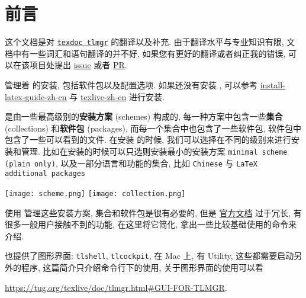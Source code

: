 \section*{前\quad 言}

这个文档是对 \href{https://www.tug.org/texlive/devsrc/Master/texmf-dist/doc/latex/tlmgrbasics/tlmgr.pdf}{\texttt{texdoc tlmgr}} 的翻译以及补充. 由于翻译水平与专业知识有限, 文档中有一些词汇和语句翻译的并不好, 如果您有更好的翻译或者纠正我的错误, 可以在该项目处提出 \href{https://github.com/syvshc/tlmgr-intro-zh-cn/issues}{issue} 或者 \href{https://github.com/syvshc/tlmgr-intro-zh-cn/pulls}{PR}. 

\tlmgr 管理着 \tl 的安装, 包括软件包以及配置选项. 如果还没有安装 \tl, 可以参考 \href{https://www.tug.org/texlive/devsrc/Master/texmf-dist/doc/latex/install-latex-guide-zh-cn/install-latex-guide-zh-cn.pdf}{install-latex-guide-zh-cn} 与 \href{https://www.tug.org/texlive/doc/texlive-zh-cn/texlive-zh-cn.pdf}{texlive-zh-cn} 进行安装. 

\tl 是由一些最高级别的\textbf{安装方案} (schemes) 构成的, 每一种方案中包含一些\textbf{集合} (collections) 和\textbf{软件包} (packages), 而每一个集合中也包含了一些软件包, 软件包中包含了一些可以看到的文件. 在安装 \tl 的时候, 我们可以选择在不同的级别来进行安装和管理. 比如在安装的时候可以只选则安装最小的安装方案 \texttt{minimal scheme (plain only)}, 以及一部分语言和功能的集合, 比如 \texttt{Chinese} 与 \texttt{LaTeX additional packages}

\begin{center}
    \texttt{[image: scheme.png]} \quad 
    \texttt{[image: collection.png]}
\end{center}

使用 \tlmgr 管理这些安装方案, 集合和软件包是很有必要的, 但是 \href{https://www.tug.org/texlive/doc/tlmgr.html}{\tlmgr 官方文档} 过于冗长, 有很多一般用户接触不到的功能, 在这里将它简化, 拿出一些比较基础使用的命令来介绍. 

\tlmgr 也提供了图形界面: \texttt{tlshell}, \texttt{tlcockpit}, 在 Mac 上, 有 \tl{} Utility, 这些都需要启动另外的程序, 这篇简介只介绍命令行下的使用, 关于图形界面的使用可以看
\begin{center}
    \url{https://tug.org/texlive/doc/tlmgr.html#GUI-FOR-TLMGR}.
\end{center}